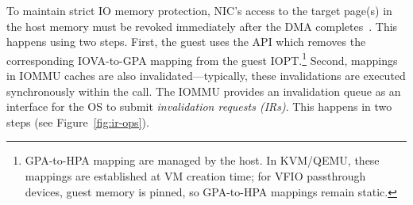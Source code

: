 To maintain strict IO memory protection, NIC's access to the target page(s) in the host memory must be revoked immediately after the DMA completes~\cite{Rubin2024FastSafe,Amit2011vIOMMU}. This happens using two steps.
First, the guest uses the  API which removes 
    the corresponding IOVA-to-GPA mapping from the guest IOPT.\footnote{GPA-to-HPA mapping are managed by the host. In KVM/QEMU, these mappings are established at VM creation time; for VFIO passthrough devices, guest memory is pinned, so GPA-to-HPA mappings remain static.} %
Second,
    mappings in IOMMU caches are also invalidated---typically, these invalidations are executed synchronously within the  call.
The IOMMU provides an invalidation queue as an interface for the OS 
    to submit {\it invalidation requests (IRs)}. This happens in two steps (see Figure~\ref{fig:ir-ops}). 


   

